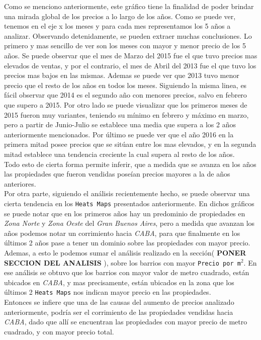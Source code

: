 \documentclass[a4paper, 10pt]{article}
\def\code#1{\texttt{#1}}
\newcommand\tab[1][0.5cm]{\hspace*{#1}}
\begin{document}
        \tab Como se menciono anteriormente, este gráfico tiene la finalidad de poder brindar una mirada global de los precios a lo largo de los años. Como se puede ver, tenemos en el eje x los meses y para cada mes representamos los 5 años a analizar. Observando detenidamente, se pueden extraer muchas conclusiones.
        Lo primero y mas sencillo de ver son los meses con mayor y menor precio de los 5 años. Se puede observar que el mes de Marzo del 2015 fue el que tuvo precios mas elevados de ventas, y por el contrario, el mes de Abril del 2013 fue el que tuvo los precios mas bajos en las mismas. Ademas se puede ver que 2013 tuvo menor precio que el resto de los años en todos los meses. Siguiendo la misma linea, es fácil observar que 2014 es el segundo año con menores precios, salvo en febrero que supero a 2015. Por otro lado se puede visualizar que los primeros meses de 2015 fueron muy variantes, teniendo su mínimo en febrero y máximo en marzo, pero a partir de Junio-Julio se establece una media que supera a los 2 años anteriormente mencionados. Por último se puede ver que el año 2016 en la primera mitad posee precios que se sitúan entre los mas elevados, y en la segunda mitad establece una tendencia creciente la cual supera al resto de los años.
       \\
       \tab Todo esto de cierta forma permite inferir, que a medida que se avanza en los años las propiedades que fueron vendidas poseían precios mayores a la de años anteriores.
       \\
       \tab Por otra parte, siguiendo el análisis recientemente hecho, se puede observar una cierta tendencia en los \code{Heats Maps} presentados anteriormente. En dichos gráficos se puede notar que en los primeros años hay un predominio de propiedades en \textit{Zona Norte} y \textit{Zona Oeste} del \textit{Gran Buenos Aires}, pero a medida que avanzan los años podemos notar un corrimiento hacia \textit{CABA}, para que finalmente en los últimos 2 años pase a tener un dominio sobre las propiedades con mayor precio. Ademas, a esto le podemos sumar el análisis realizado en la sección( \textbf{PONER SECCION DEL ANALISIS} ), sobre los barrios con mayor \code{Precio por m$^2$}. En ese análisis se obtuvo que los barrios con mayor valor de metro cuadrado, están ubicados en \textit{CABA}, y mas precisamente, están ubicados en la zona que los últimos 2 \code{Heats Maps} nos indican mayor precio en las propiedades.
       \\
       \tab Entonces se infiere que una de las causas del aumento de precios analizado anteriormente, podría ser el corrimiento de las propiedades vendidas hacia \textit{CABA}, dado que allí se encuentran las propiedades con mayor precio de metro cuadrado, y con mayor precio total.
\end{document}
